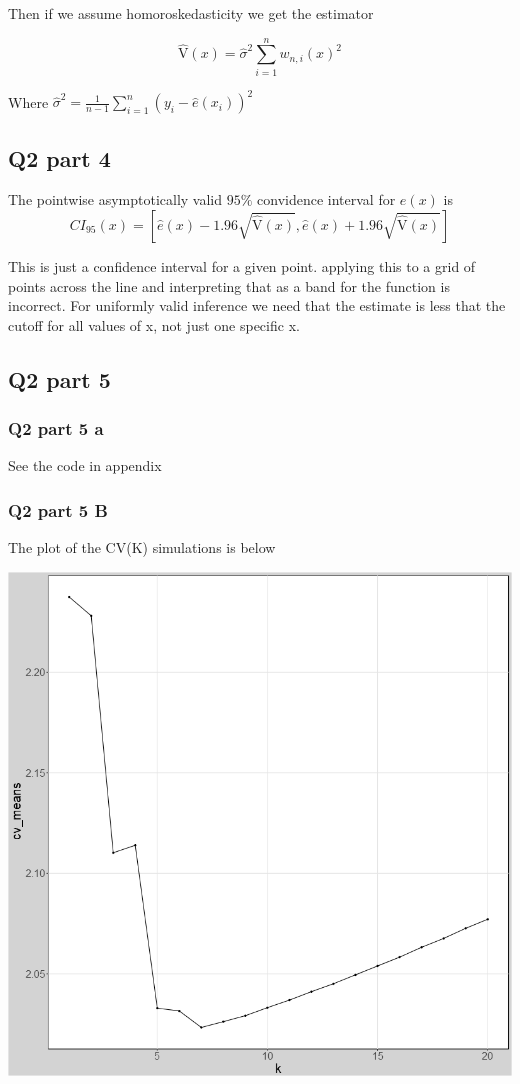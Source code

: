 \documentclass[11pt]{article}
\newcommand{\V}{\mathrm{V}}
\begin{document}
Then if we assume homoroskedasticity we get the estimator

$$\hat{\V}(x) = \hat{\sigma}^2 \sum_{i=1}^{n}w_{n,i}(x)^2$$

	
Where 
$\hat{\sigma}^2 = \frac{1}{n-1} \sum_{i=1}^{n} (y_i - \hat{e}(x_i))^2$

\subsection{Q2 part 4}

The pointwise asymptotically valid $95\% $ convidence interval for $e(x)$ is 
$$CI_{95}(x) = [\hat{e}(x) - 1.96 \sqrt{\hat{\V}(x)}, \hat{e}(x) + 1.96 \sqrt{\hat{\V}(x)}] $$

This is just a confidence interval for a given point. applying this to a grid of points across the line and interpreting that as a band for the function is incorrect. For uniformly valid inference we need that the estimate is less that the cutoff for all values of x, not just one specific x. 

\subsection{Q2 part 5}
\subsubsection{Q2 part 5 a}
See the code in appendix 

\subsubsection{Q2 part 5 B} 
The plot of the CV(K) simulations is below 
\begin{center}
	\includegraphics[width=.6\linewidth]{plot_2_5_b.png}
	
\end{center}
\end{document}
